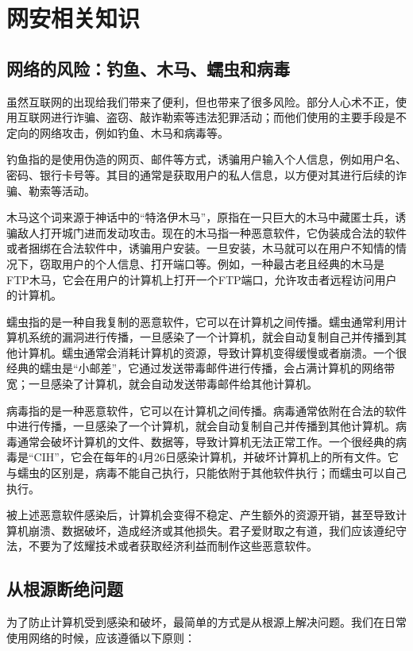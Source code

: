 \documentclass[12pt]{report}
\begin{document}
\section{网安相关知识} %

\subsection{网络的风险：钓鱼、木马、蠕虫和病毒}

虽然互联网的出现给我们带来了便利，但也带来了很多风险。部分人心术不正，使用互联网进行诈骗、盗窃、敲诈勒索等违法犯罪活动；而他们使用的主要手段是不定向的网络攻击，例如钓鱼、木马和病毒等。

钓鱼指的是使用伪造的网页、邮件等方式，诱骗用户输入个人信息，例如用户名、密码、银行卡号等。其目的通常是获取用户的私人信息，以方便对其进行后续的诈骗、勒索等活动。

木马这个词来源于神话中的“特洛伊木马”，原指在一只巨大的木马中藏匿士兵，诱骗敌人打开城门进而发动攻击。现在的木马指一种恶意软件，它伪装成合法的软件或者捆绑在合法软件中，诱骗用户安装。一旦安装，木马就可以在用户不知情的情况下，窃取用户的个人信息、打开端口等。例如，一种最古老且经典的木马是FTP木马，它会在用户的计算机上打开一个FTP端口，允许攻击者远程访问用户的计算机。

蠕虫指的是一种自我复制的恶意软件，它可以在计算机之间传播。蠕虫通常利用计算机系统的漏洞进行传播，一旦感染了一个计算机，就会自动复制自己并传播到其他计算机。蠕虫通常会消耗计算机的资源，导致计算机变得缓慢或者崩溃。一个很经典的蠕虫是“小邮差”，它通过发送带毒邮件进行传播，会占满计算机的网络带宽；一旦感染了计算机，就会自动发送带毒邮件给其他计算机。

病毒指的是一种恶意软件，它可以在计算机之间传播。病毒通常依附在合法的软件中进行传播，一旦感染了一个计算机，就会自动复制自己并传播到其他计算机。病毒通常会破坏计算机的文件、数据等，导致计算机无法正常工作。一个很经典的病毒是“CIH”，它会在每年的4月26日感染计算机，并破坏计算机上的所有文件。它与蠕虫的区别是，病毒不能自己执行，只能依附于其他软件执行；而蠕虫可以自己执行。

被上述恶意软件感染后，计算机会变得不稳定、产生额外的资源开销，甚至导致计算机崩溃、数据破坏，造成经济或其他损失。君子爱财取之有道，我们应该遵纪守法，不要为了炫耀技术或者获取经济利益而制作这些恶意软件。

\subsection{从根源断绝问题}

为了防止计算机受到感染和破坏，最简单的方式是从根源上解决问题。我们在日常使用网络的时候，应该遵循以下原则：
\end{document}
